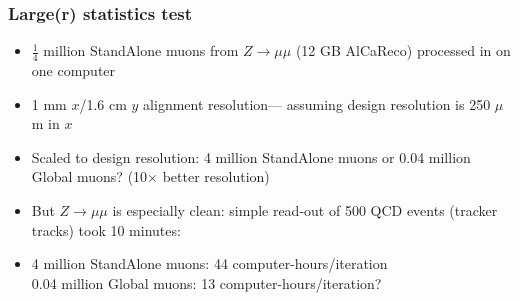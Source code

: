 \documentclass[compress]{beamer}
\begin{document}


\begin{frame}
\frametitle{Large(r) statistics test}
\begin{itemize}\setlength{\itemsep}{0.4 cm}
\item $\frac{1}{4}$ million StandAlone muons from $Z\to\mu\mu$ (12 GB AlCaReco) processed in  on one computer
\item 1 mm $x$/1.6 cm $y$ alignment resolution--- assuming design resolution is 250 $\mu$m in $x$
\item Scaled to design resolution: 4 million StandAlone
muons or 0.04 million Global muons?  (10$\times$ better resolution)
\item But $Z\to\mu\mu$ is especially clean: simple read-out of 500 QCD
events (tracker tracks) took 10 minutes: 
\item 4 million StandAlone muons: 44 computer-hours/iteration \\
0.04 million Global muons: 13 computer-hours/iteration?
\end{itemize}
\end{frame}
\end{document}
